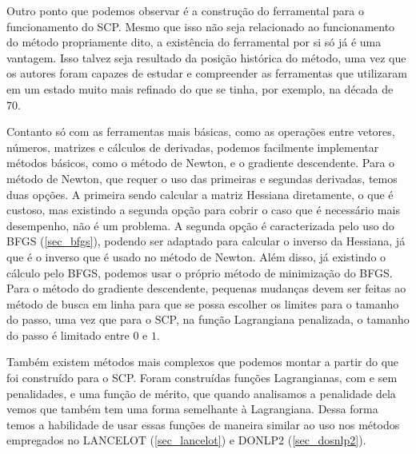 Outro ponto que podemos observar é a construção do ferramental para o funcionamento
do SCP. Mesmo que isso não seja relacionado ao funcionamento do método propriamente
dito, a existência do ferramental por si só já é uma vantagem. Isso talvez seja resultado
da posição histórica do método, uma vez que os autores foram capazes de estudar e
compreender as ferramentas que utilizaram em um estado muito mais refinado do que
se tinha, por exemplo, na década de 70.

Contanto só com as ferramentas mais básicas, como as operações entre vetores, números,
matrizes e cálculos de derivadas, podemos facilmente implementar métodos básicos, como
o método de Newton, e o gradiente descendente. Para o método de Newton, que requer o
uso das primeiras e segundas derivadas, temos duas opções. A primeira sendo calcular
a matriz Hessiana diretamente, o que é custoso, mas existindo a segunda opção para
cobrir o caso que é necessário mais desempenho, não é um problema. A segunda opção
é caracterizada pelo uso do BFGS (\ref{sec_bfgs}), podendo ser adaptado para calcular
o inverso da Hessiana, já que é o inverso que é usado no método de Newton. Além disso,
já existindo o cálculo pelo BFGS, podemos usar o próprio método de minimização do BFGS.
Para o método do gradiente descendente, pequenas mudanças devem ser feitas ao método de
busca em linha para que se possa escolher os limites para o tamanho do passo, uma
vez que para o SCP, na função Lagrangiana penalizada, o tamanho do passo é limitado
entre \(0\) e \(1\).

Também existem métodos mais complexos que podemos montar a partir do que foi construído
para o SCP. Foram construídas funções Lagrangianas, com e sem penalidades, e uma função
de mérito, que quando analisamos a penalidade dela vemos que também tem uma forma semelhante
à Lagrangiana. Dessa forma temos a habilidade de usar essas funções de maneira similar ao uso
nos métodos empregados no LANCELOT (\ref{sec_lancelot}) e DONLP2 (\ref{sec_dosnlp2}).
